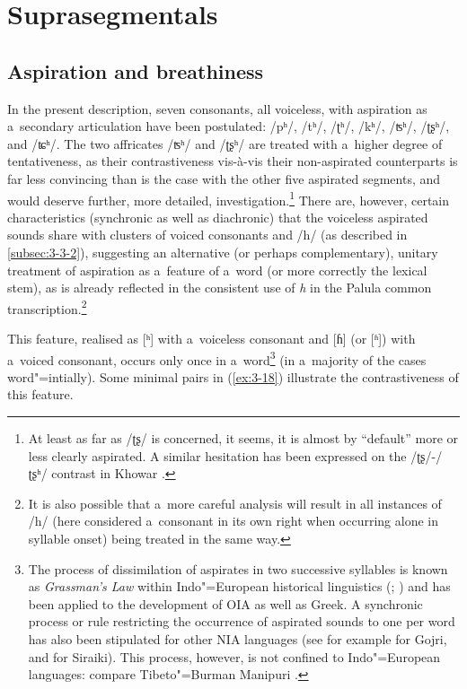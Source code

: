 \section{Suprasegmentals}
\label{sec:3-4}

\subsection{Aspiration and breathiness}
\label{subsec:3-4-1}

In the present description, seven consonants, all voiceless, with aspiration as a~secondary articulation have been postulated: /pʰ/, /tʰ/, /ʈʰ/, /kʰ/, /ʦʰ/, /ʈʂʰ/, and /ʨʰ/. The two affricates /ʦʰ/ and /ʈʂʰ/ are treated with a~higher degree of tentativeness, as their contrastiveness vis-à-vis their non-aspirated counterparts is far less convincing than is the case with the other five aspirated segments, and would deserve further, more detailed, investigation.\footnote{At least as far as /ʈʂ/ is concerned, it seems, it is almost by ``default'' more or less clearly aspirated. A similar hesitation has been expressed on the /ʈʂ/-/ʈʂʰ/ contrast in Khowar \citep[239]{endresenkristiansen1981}.} There are, however, certain characteristics (synchronic as well as diachronic) that the voiceless aspirated sounds share with clusters of voiced consonants and /h/ (as described in \ref{subsec:3-3-2}), suggesting an alternative (or perhaps complementary), unitary treatment of aspiration as a~feature of a~word (or more correctly the lexical stem), as is already reflected in the consistent use of \textit{h} in the Palula common transcription.\footnote{It is also possible that a~more careful analysis will result in all instances of /h/ (here considered a~consonant in its own right when occurring alone in syllable onset) being treated in the same way.} 


This feature, realised as [ʰ] with a~voiceless consonant and [ɦ] (or [ʱ]) with a~voiced consonant, occurs only once in a~word\footnote{\label{fnt:ftn32} The process of dissimilation of aspirates in two successive syllables is known as \textit{Grassman's Law} within Indo"=European historical linguistics (\citealt[19, 56]{szemerenyi1996}; \citealt[153--154, 162--163]{lehmann1992}) and has been applied to the development of OIA as well as Greek. A synchronic process or rule restricting the occurrence of aspirated sounds to one per word has also been stipulated for other NIA languages (see for example \citet[32]{losey2002} for Gojri, and \citet[34--35]{shackle1976} for Siraiki). This process, however, is not confined to Indo"=European languages: compare Tibeto"=Burman Manipuri \citep[13--14]{bhatningomba1997}.} (in a~majority of the cases word"=intially). Some minimal pairs in (\ref{ex:3-18}) illustrate the contrastiveness of this feature.


